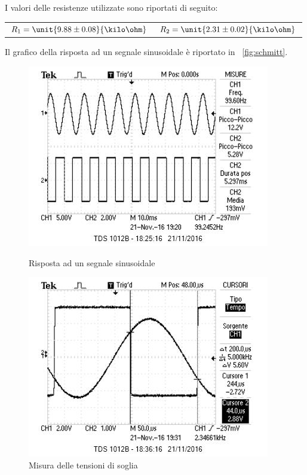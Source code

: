\documentclass[10pt,a4paper]{article}
\begin{document}
I valori delle resistenze utilizzate sono riportati di seguito:

\begin{table}[H]
	\centering
	\begin{tabular}{cc}
        $ R_1 = \unit{9.88 \pm 0.08}{\kilo\ohm}$  & $R_2 = \unit{2.31 \pm 0.02}{\kilo\ohm}$
	\end{tabular}
\end{table}

Il grafico della risposta ad un segnale sinusoidale è riportato in \figurename{~\ref{fig:schmitt}}.

\begin{figure}[H]
    \centering
    \begin{minipage}{0.49\textwidth}
	    \includegraphics[width=\textwidth]{../oscilloscopio/schmitt.jpg}
	    \caption{Risposta ad un segnale sinusoidale}
	    \label{fig:schmitt}
    \end{minipage}
    \begin{minipage}{0.49\textwidth}
        \includegraphics[width=\textwidth]{../oscilloscopio/schmitt_soglia.jpg}
        \caption{Misura delle tensioni di soglia}
        \label{fig:schmitt_soglia}
    \end{minipage}
\end{figure}
\end{document}
